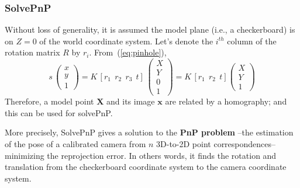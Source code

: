 


\subsubsection{SolvePnP}
\label{sec:solvePnP}

Without loss of generality, it is assumed the model plane (i.e., a checkerboard) is on $Z=0$ of the world coordinate system. Let's denote the $i^{th}$ column of the rotation matrix $R$ by $r_i$. From~(\ref{eq:pinhole}),
\begin{equation}
  s\,\begin{pmatrix}
      x \\
      y \\
      1
\end{pmatrix}
= K\, [r_1~~r_2~~r_3~~t]\,\begin{pmatrix}
      X \\
      Y \\
      0 \\
      1
\end{pmatrix}
= K\, [r_1~~r_2~~t]\begin{pmatrix}
      X \\
      Y \\
      1
\end{pmatrix}
\end{equation}
Therefore, a model point $\mathbf{X}$ and its image $\mathbf{x}$ are related by a homography; and this can be used for solvePnP. %

More precisely, SolvePnP gives a solution to the \textbf{PnP problem} --the estimation of the pose of a calibrated camera from $n$ 3D-to-2D point correspondences-- minimizing the reprojection error. In others words, it finds the rotation and translation from the checkerboard coordinate system to the camera coordinate system.



%
%
%
%





